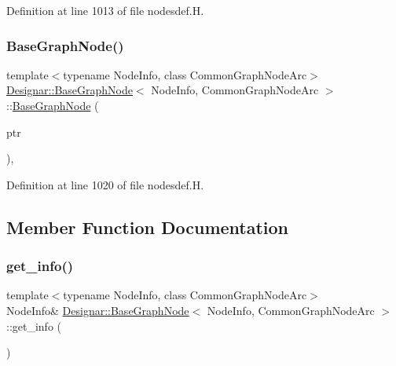 Definition at line 1013 of file nodesdef.\+H.

\mbox{\label{class_designar_1_1_base_graph_node_aa64ba400e5d1fff18b7fb10071e7b97c}} 
\subsubsection{\texorpdfstring{Base\+Graph\+Node()}{BaseGraphNode()}\hspace{0.1cm}{\footnotesize\ttfamily [4/4]}}
{\footnotesize\ttfamily template$<$typename Node\+Info, class Common\+Graph\+Node\+Arc$>$ \\
\hyperlink{class_designar_1_1_base_graph_node}{Designar\+::\+Base\+Graph\+Node}$<$ Node\+Info, Common\+Graph\+Node\+Arc $>$\+::\hyperlink{class_designar_1_1_base_graph_node}{Base\+Graph\+Node} (\begin{DoxyParamCaption}\item[{\hyperlink{class_designar_1_1_base_graph_node}{Base\+Graph\+Node}$<$ Node\+Info, Common\+Graph\+Node\+Arc $>$ $\ast$}]{ptr }\end{DoxyParamCaption})\hspace{0.3cm}{\ttfamily [inline]}, {\ttfamily [protected]}}



Definition at line 1020 of file nodesdef.\+H.



\subsection{Member Function Documentation}
\mbox{\label{class_designar_1_1_base_graph_node_a5626bf91fcef0dd6f29dc503c33ecfc9}} 
\subsubsection{\texorpdfstring{get\+\_\+info()}{get\_info()}\hspace{0.1cm}{\footnotesize\ttfamily [1/2]}}
{\footnotesize\ttfamily template$<$typename Node\+Info, class Common\+Graph\+Node\+Arc$>$ \\
Node\+Info\& \hyperlink{class_designar_1_1_base_graph_node}{Designar\+::\+Base\+Graph\+Node}$<$ Node\+Info, Common\+Graph\+Node\+Arc $>$\+::get\+\_\+info (\begin{DoxyParamCaption}{ }\end{DoxyParamCaption})\hspace{0.3cm}{\ttfamily [inline]}}



